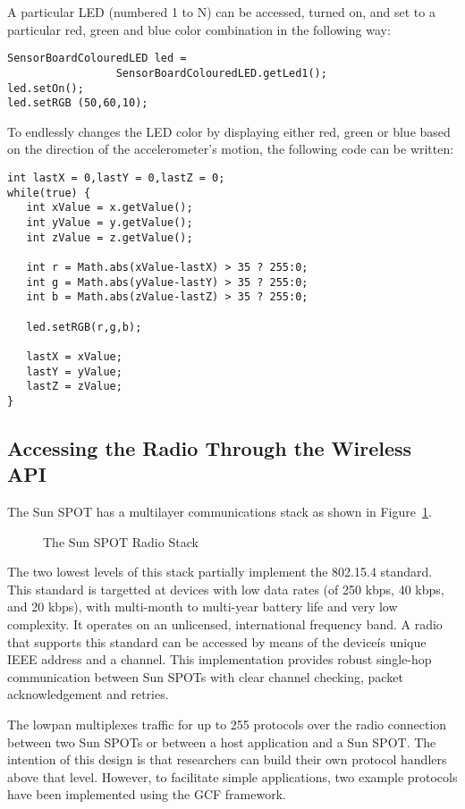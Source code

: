 \documentclass{sigplanconf}
\newcommand{\psfigbegin}[2]{\begin{figure}[htp] \centerline{\psfig{figure={#1},height={#2}}} }
\newcommand{\psfigend}[2]{{\small \bf \caption{\label{#1} {#2}}} \end{figure} }
\begin{document}
A particular LED (numbered 1 to N) can be accessed, turned on, 
and set to a particular red, green and blue color combination in
the following way: 

\begin{verbatim}
SensorBoardColouredLED led = 
                 SensorBoardColouredLED.getLed1();
led.setOn();        
led.setRGB (50,60,10);  
\end{verbatim}

To endlessly changes the LED color by displaying either red, green or blue  
based on the direction of the accelerometer's motion, the following code
can be written:  

\begin{verbatim}
int lastX = 0,lastY = 0,lastZ = 0;
while(true) {
   int xValue = x.getValue();
   int yValue = y.getValue();
   int zValue = z.getValue();

   int r = Math.abs(xValue-lastX) > 35 ? 255:0;                    
   int g = Math.abs(yValue-lastY) > 35 ? 255:0;
   int b = Math.abs(zValue-lastZ) > 35 ? 255:0;

   led.setRGB(r,g,b);

   lastX = xValue;
   lastY = yValue;
   lastZ = zValue;
}
\end{verbatim}


\subsection{Accessing the Radio Through the Wireless API}
\label{sec-radio}

The Sun SPOT has a multilayer communications stack as shown 
in Figure~\ref{fig-radiostack}.

\psfigbegin{SunSPOTRadioStack.eps}{3cm}
\psfigend{fig-radiostack}{The Sun SPOT Radio Stack}

The two lowest levels of this stack partially implement the 802.15.4 standard. This standard is targetted at devices with low data rates (of 250 kbps, 40 kbps, and 20 kbps), with multi-month to multi-year battery life and very low complexity. It operates on an unlicensed, international frequency band. A radio that supports this standard can be accessed by means of the deviceís unique IEEE address and a channel. This implementation provides robust single-hop  communication between Sun SPOTs with clear channel checking, packet acknowledgement and retries.

The lowpan multiplexes traffic for up to 255 protocols over the radio connection between 
two Sun SPOTs or between a host application and a Sun SPOT. The intention of this design 
is that researchers can build their own protocol handlers above that level. However, to 
facilitate simple applications, two example protocols have been implemented using the 
GCF framework.
\end{document}
